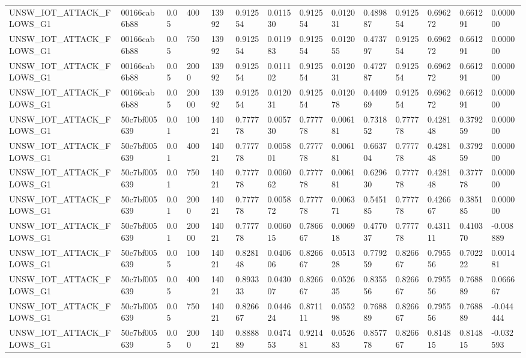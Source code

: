 \begin{tabular}{llllllllllllll}
UNSW\_IOT\_ATTACK\_FLOWS\_G1 & 00166cab6b88 & 0.05 & 400 & 13992 & 0.912554 & 0.011530 & 0.912554 & 0.012031 & 0.489887 & 0.912554 & 0.696272 & 0.661291 & 0.000000 \\
UNSW\_IOT\_ATTACK\_FLOWS\_G1 & 00166cab6b88 & 0.05 & 750 & 13992 & 0.912554 & 0.011983 & 0.912554 & 0.012055 & 0.473797 & 0.912554 & 0.696272 & 0.661291 & 0.000000 \\
UNSW\_IOT\_ATTACK\_FLOWS\_G1 & 00166cab6b88 & 0.05 & 2000 & 13992 & 0.912554 & 0.011102 & 0.912554 & 0.012031 & 0.472787 & 0.912554 & 0.696272 & 0.661291 & 0.000000 \\
UNSW\_IOT\_ATTACK\_FLOWS\_G1 & 00166cab6b88 & 0.05 & 20000 & 13992 & 0.912554 & 0.012031 & 0.912554 & 0.012078 & 0.440969 & 0.912554 & 0.696272 & 0.661291 & 0.000000 \\
UNSW\_IOT\_ATTACK\_FLOWS\_G1 & 50c7bf005639 & 0.01 & 100 & 14021 & 0.777778 & 0.005730 & 0.777778 & 0.006181 & 0.731852 & 0.777778 & 0.428148 & 0.379259 & 0.000000 \\
UNSW\_IOT\_ATTACK\_FLOWS\_G1 & 50c7bf005639 & 0.01 & 400 & 14021 & 0.777778 & 0.005801 & 0.777778 & 0.006181 & 0.663704 & 0.777778 & 0.428148 & 0.379259 & 0.000000 \\
UNSW\_IOT\_ATTACK\_FLOWS\_G1 & 50c7bf005639 & 0.01 & 750 & 14021 & 0.777778 & 0.006062 & 0.777778 & 0.006181 & 0.629630 & 0.777778 & 0.428148 & 0.377778 & 0.000000 \\
UNSW\_IOT\_ATTACK\_FLOWS\_G1 & 50c7bf005639 & 0.01 & 2000 & 14021 & 0.777778 & 0.005872 & 0.777778 & 0.006371 & 0.545185 & 0.777778 & 0.426667 & 0.385185 & 0.000000 \\
UNSW\_IOT\_ATTACK\_FLOWS\_G1 & 50c7bf005639 & 0.01 & 20000 & 14021 & 0.777778 & 0.006015 & 0.786667 & 0.006918 & 0.477037 & 0.777778 & 0.431111 & 0.410370 & -0.008889 \\
UNSW\_IOT\_ATTACK\_FLOWS\_G1 & 50c7bf005639 & 0.05 & 100 & 14021 & 0.828148 & 0.040606 & 0.826667 & 0.051328 & 0.779259 & 0.826667 & 0.795556 & 0.702222 & 0.001481 \\
UNSW\_IOT\_ATTACK\_FLOWS\_G1 & 50c7bf005639 & 0.05 & 400 & 14021 & 0.893333 & 0.043007 & 0.826667 & 0.052635 & 0.835556 & 0.826667 & 0.795556 & 0.768889 & 0.066667 \\
UNSW\_IOT\_ATTACK\_FLOWS\_G1 & 50c7bf005639 & 0.05 & 750 & 14021 & 0.826667 & 0.044624 & 0.871111 & 0.055298 & 0.768889 & 0.826667 & 0.795556 & 0.768889 & -0.044444 \\
UNSW\_IOT\_ATTACK\_FLOWS\_G1 & 50c7bf005639 & 0.05 & 2000 & 14021 & 0.888889 & 0.047453 & 0.921481 & 0.052683 & 0.857778 & 0.826667 & 0.814815 & 0.814815 & -0.032593 \\

\end{tabular}
